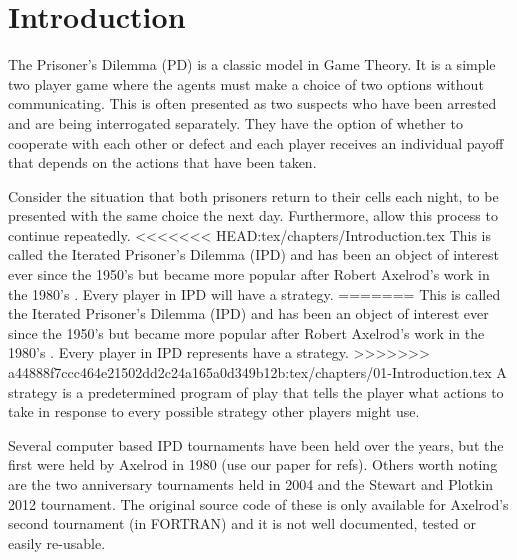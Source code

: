 
\chapter{Introduction}\label{cha:introduction}

The Prisoner's Dilemma (PD) is a classic model in Game Theory.
It is a simple two player game where the agents must make a choice of two options without communicating.
This is often presented as two suspects who have been arrested and are being interrogated separately.
They have the option of whether to cooperate with each other or defect and each player receives an individual payoff that depends on the actions that have been taken.

Consider the situation that both prisoners return to their cells each night, to be presented with the same choice the next day.
Furthermore, allow this process to continue repeatedly.
<<<<<<< HEAD:tex/chapters/Introduction.tex
This is called the Iterated Prisoner's Dilemma (IPD) and has been an object of interest ever since the 1950's but became more popular after Robert Axelrod's work in the 1980's \cite{Axelrod1980a}.
Every player in IPD will have a strategy.
=======
This is called the Iterated Prisoner's Dilemma (IPD) and has been an object of interest ever since the 1950's but became more popular after Robert Axelrod's work in the 1980's \cite{Axelrod2016}.
Every player in IPD represents have a strategy.
>>>>>>> a44888f7ccc464e21502dd2c24a165a0d349b12b:tex/chapters/01-Introduction.tex
A strategy is a predetermined program of play that tells the player what actions to take in response to every possible strategy other players might use.

Several computer based IPD tournaments have been held over the years, but the
first were held by Axelrod in 1980 (use our paper for refs). %
Others worth noting are the two anniversary tournaments  held in 2004 and the Stewart and Plotkin 2012 tournament.
The original source code of these is only available for Axelrod's second tournament (in FORTRAN) and it is not well documented, tested or easily re-usable.

